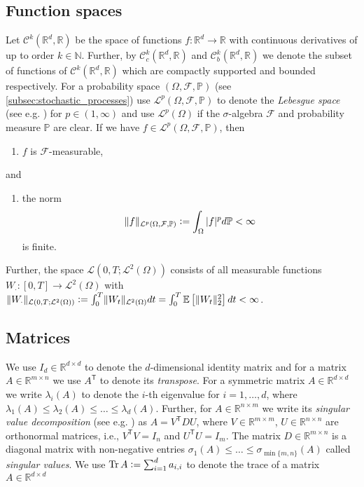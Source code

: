 \documentclass[12pt]{article}
\theoremstyle{definition}
\numberwithin{equation}{section}
\newcommand{\N}{\mathbb{N}}
\newcommand{\R}{\mathbb{R}}
\newcommand{\BP}{\mathbb{P}}
\newcommand{\CF}{\mathcal{F}}
\newcommand{\CL}{\mathcal{L}}
\newcommand{\CC}{\mathcal{C}}
\newcommand{\T}{\mathsf{T}}
\newcommand{\ev}[1]{\mathbb{E}\left[{#1}\right]}
\newcommand{\norm}[1]{\lVert{#1}\rVert_2}
\newcommand{\defeq}{\vcentcolon=}
\DeclareMathOperator{\Tr}{Tr}
\begin{document}
\subsection{Function spaces}
Let $\CC^k(\R^d, \R)$ be the space of functions $f: \R^d \rightarrow \R$ with continuous derivatives of up to order $k \in \N$. Further, by $\CC_c^k(\R^d, \R)$ and $\CC_b^k(\R^d, \R)$ we denote the subset of functions of $\CC^k(\R^d, \R)$ which are compactly supported and bounded respectively.
For a probability space $(\Omega, \CF, \BP)$ (see \autoref{subsec:stochastic_processes}) use $\CL^p(\Omega, \CF, \BP)$ to denote the \emph{Lebesgue space} (see e.g. \cite[pp.~636]{evansPartialDifferentialEquations2010})  for $p \in (1,\infty)$ and use $\CL^p(\Omega)$ if the $\sigma$-algebra $\CF$ and probability measure $\BP$ are clear. If we have $f \in\CL^p(\Omega, \CF, \BP)$, then
\begin{enumerate}[label=(\roman*)]
  \item $f$ is $\CF$-measurable,
\end{enumerate}
and
\begin{enumerate}[resume, label=(\roman*)]
  \item the norm 
  \begin{equation*}
    \lVert f \rVert_{\CL^p(\Omega, \CF, \BP)} \defeq \int_{\Omega} |f|^p d\BP < \infty
  \end{equation*}
  is finite.
\end{enumerate}
Further, the space $\CL(0,T;\CL^2(\Omega))$ consists of all measurable functions $W_{\cdot} : [0,T] \rightarrow \CL^2(\Omega)$ with $\lVert W_{\cdot} \rVert_{\CL(0,T;\CL^2(\Omega))} \defeq \int_0^T \lVert W_t \rVert_{\CL^2(\Omega)}dt = \int_0^T \ev{\norm{W_t}^2}dt < \infty$.
\subsection{Matrices}
We use $I_d \in \R^{d \times d}$ to denote the $d$-dimensional identity matrix and for a matrix $A \in \R^{m \times n}$ we use $A^\T$ to denote its \emph{transpose}.
For a symmetric matrix $A \in \R^{d \times d}$ we write $\lambda_i(A)$ to denote the $i$-th eigenvalue for $i=1,\dots,d$, where $\lambda_1(A) \leq \lambda_2(A) \leq \dots \leq \lambda_d(A)$. Further, for $A \in \R^{n \times m}$ we write its \emph{singular value decomposition} (see e.g. \cite{lycheNumericalLinearAlgebra2020}) as $A = V^\T D U$, where $V \in \R^{m \times m}$, $U \in \R^{n \times n}$ are orthonormal matrices, i.e., $V^\T V = I_n$ and $U^\T U = I_m$. The matrix $D \in \R^{m \times n}$ is a diagonal matrix with non-negative entries $\sigma_1(A) \leq \dots \leq \sigma_{\min\{m,n\}}(A)$ called \emph{singular values}. We use $\Tr A \defeq \sum_{i=1}^d a_{i,i}$ to denote the trace of a matrix $A \in \R^{d \times d}$
\end{document}
